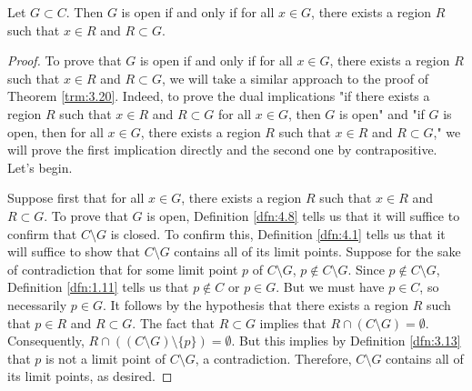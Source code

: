\documentclass[../main.tex]{subfiles}
\begin{document}
\begin{theorem}\label{trm:4.10}
    Let $G\subset C$. Then $G$ is open if and only if for all $x\in G$, there exists a region $R$ such that $x\in R$ and $R\subset G$.
    \begin{proof}
        To prove that $G$ is open if and only if for all $x\in G$, there exists a region $R$ such that $x\in R$ and $R\subset G$, we will take a similar approach to the proof of Theorem \ref{trm:3.20}. Indeed, to prove the dual implications "if there exists a region $R$ such that $x\in R$ and $R\subset G$ for all $x\in G$, then $G$ is open" and "if $G$ is open, then for all $x\in G$, there exists a region $R$ such that $x\in R$ and $R\subset G$," we will prove the first implication directly and the second one by contrapositive. Let's begin.\par
        Suppose first that for all $x\in G$, there exists a region $R$ such that $x\in R$ and $R\subset G$. To prove that $G$ is open, Definition \ref{dfn:4.8} tells us that it will suffice to confirm that $C\setminus G$ is closed. To confirm this, Definition \ref{dfn:4.1} tells us that it will suffice to show that $C\setminus G$ contains all of its limit points. Suppose for the sake of contradiction that for some limit point $p$ of $C\setminus G$, $p\notin C\setminus G$. Since $p\notin C\setminus G$, Definition \ref{dfn:1.11} tells us that $p\notin C$ or $p\in G$. But we must have $p\in C$, so necessarily $p\in G$. It follows by the hypothesis that there exists a region $R$ such that $p\in R$ and $R\subset G$. The fact that $R\subset G$ implies that $R\cap(C\setminus G)=\emptyset$. Consequently, $R\cap((C\setminus G)\setminus\{p\})=\emptyset$. But this implies by Definition \ref{dfn:3.13} that $p$ is not a limit point of $C\setminus G$, a contradiction. Therefore, $C\setminus G$ contains all of its limit points, as desired.\par

\end{proof}
\end{theorem}
\end{document}
